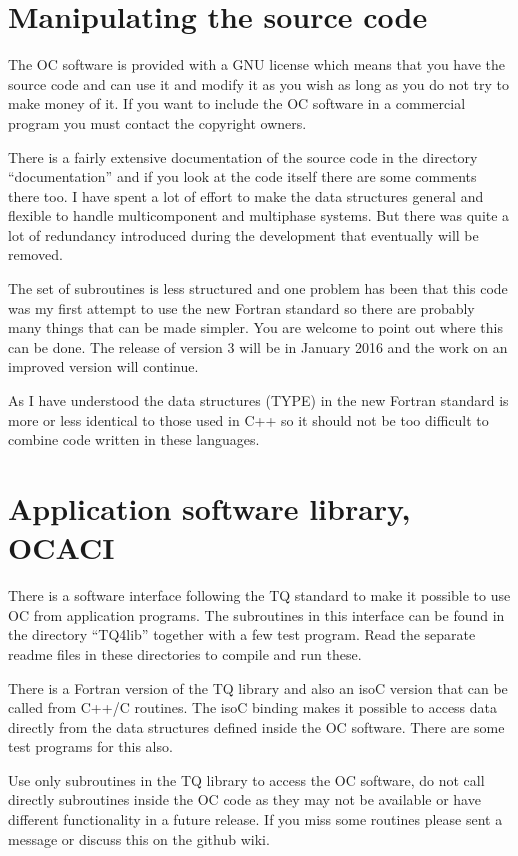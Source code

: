 \documentclass[12pt]{article}
\begin{document}
\section{Manipulating the source code}

The OC software is provided with a GNU license which means that you
have the source code and can use it and modify it as you wish as long
as you do not try to make money of it.  If you want to include the OC
software in a commercial program you must contact the copyright
owners.

There is a fairly extensive documentation of the source code in the
directory ``documentation'' and if you look at the code itself there
are some comments there too.  I have spent a lot of effort to make the
data structures general and flexible to handle multicomponent and
multiphase systems.  But there was quite a lot of redundancy
introduced during the development that eventually will be removed.

The set of subroutines is less structured and one problem has been
that this code was my first attempt to use the new Fortran standard so
there are probably many things that can be made simpler.  You are
welcome to point out where this can be done.  The release of version 3
will be in January 2016 and the work on an improved version will
continue.

As I have understood the data structures (TYPE) in the new Fortran
standard is more or less identical to those used in C++ so it should
not be too difficult to combine code written in these languages.

\section{Application software library, OCACI}

There is a software interface following the TQ standard to make it
possible to use OC from application programs.  The subroutines in this
interface can be found in the directory ``TQ4lib'' together with a few
test program.  Read the separate readme files in these directories to
compile and run these.

There is a Fortran version of the TQ library and also an isoC version
that can be called from C++/C routines.  The isoC binding makes it
possible to access data directly from the data structures defined
inside the OC software.  There are some test programs for this also.

Use only subroutines in the TQ library to access the OC software, do
not call directly subroutines inside the OC code as they may not be
available or have different functionality in a future release.  If
you miss some routines please sent a message or discuss this on the
github wiki.
\end{document}
